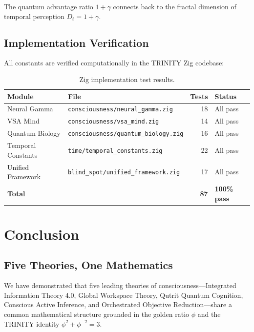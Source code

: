 \documentclass[12pt,a4paper]{article}
\begin{document}
\noindent
The quantum advantage ratio $1 + \gamma$ connects back to the fractal dimension
of temporal perception $D_t = 1 + \gamma$.

\subsection{Implementation Verification}

All constants are verified computationally in the TRINITY Zig codebase:

\begin{table}[h!]
\centering
\caption{Zig implementation test results.}
\label{tab:zig_tests}
\begin{tabular}{@{}llrl@{}}
\toprule
\textbf{Module} & \textbf{File} & \textbf{Tests} & \textbf{Status} \\
\midrule
Neural Gamma & \texttt{consciousness/neural\_gamma.zig} & 18 & All pass \\
VSA Mind & \texttt{consciousness/vsa\_mind.zig} & 14 & All pass \\
Quantum Biology & \texttt{consciousness/quantum\_biology.zig} & 16 & All pass \\
Temporal Constants & \texttt{time/temporal\_constants.zig} & 22 & All pass \\
Unified Framework & \texttt{blind\_spot/unified\_framework.zig} & 17 & All pass \\
\midrule
\textbf{Total} & & \textbf{87} & \textbf{100\% pass} \\
\bottomrule
\end{tabular}
\end{table}

\section{Conclusion}
\label{sec:conclusion}

\subsection{Five Theories, One Mathematics}

We have demonstrated that five leading theories of consciousness---Integrated
Information Theory 4.0, Global Workspace Theory, Qutrit Quantum Cognition,
Conscious Active Inference, and Orchestrated Objective Reduction---share a
common mathematical structure grounded in the golden ratio $\phi$ and the
TRINITY identity $\phi^2 + \phi^{-2} = 3$.
\end{document}
